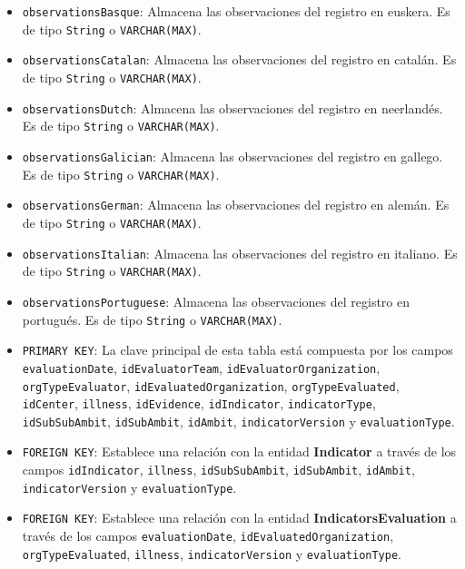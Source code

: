 \begin{itemize}
\begin{itemize}
        \item \texttt{observationsBasque}: Almacena las observaciones del registro en euskera. Es de tipo \texttt{String} o \texttt{VARCHAR(MAX)}.
        \item \texttt{observationsCatalan}: Almacena las observaciones del registro en catalán. Es de tipo \texttt{String} o \texttt{VARCHAR(MAX)}.
        \item \texttt{observationsDutch}: Almacena las observaciones del registro en neerlandés. Es de tipo \texttt{String} o \texttt{VARCHAR(MAX)}.
        \item \texttt{observationsGalician}: Almacena las observaciones del registro en gallego. Es de tipo \texttt{String} o \texttt{VARCHAR(MAX)}.
        \item \texttt{observationsGerman}: Almacena las observaciones del registro en alemán. Es de tipo \texttt{String} o \texttt{VARCHAR(MAX)}.
        \item \texttt{observationsItalian}: Almacena las observaciones del registro en italiano. Es de tipo \texttt{String} o \texttt{VARCHAR(MAX)}.
        \item \texttt{observationsPortuguese}: Almacena las observaciones del registro en portugués. Es de tipo \texttt{String} o \texttt{VARCHAR(MAX)}.
      \item \texttt{PRIMARY KEY}: La clave principal de esta tabla está compuesta por los campos \texttt{evaluationDate}, \texttt{idEvaluatorTeam}, \texttt{idEvaluatorOrganization}, \texttt{orgTypeEvaluator}, \texttt{idEvaluatedOrganization}, \texttt{orgTypeEvaluated}, \texttt{idCenter}, \texttt{illness}, \texttt{idEvidence}, \texttt{idIndicator}, \texttt{indicatorType}, \texttt{idSubSubAmbit}, \texttt{idSubAmbit}, \texttt{idAmbit}, \texttt{indicatorVersion} y \texttt{evaluationType}.
      \item \texttt{FOREIGN KEY}: Establece una relación con la entidad \textbf{Indicator} a través de los campos \texttt{idIndicator}, \texttt{illness}, \texttt{idSubSubAmbit}, \texttt{idSubAmbit}, \texttt{idAmbit}, \texttt{indicatorVersion} y \texttt{evaluationType}.
      \item \texttt{FOREIGN KEY}: Establece una relación con la entidad \textbf{IndicatorsEvaluation} a través de los campos \texttt{evaluationDate}, \texttt{idEvaluatedOrganization}, \texttt{orgTypeEvaluated}, \texttt{illness}, \texttt{indicatorVersion} y \texttt{evaluationType}.
    \end{itemize}
        



\end{itemize}
